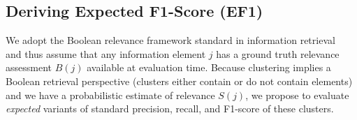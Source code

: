 





\subsection{Deriving Expected F1-Score (EF1)}

We adopt the Boolean relevance framework standard in information retrieval~\cite{Baeza-Yates2010} and thus assume that any information element $j$ has a ground truth relevance assessment $B(j)$ available at evaluation time.  
Because clustering implies a Boolean retrieval perspective (clusters either contain or do not contain elements) and we have a probabilistic estimate of relevance $S(j)$, we propose to evaluate
\emph{expected} variants of standard precision, recall, and F1-score of these clusters.

